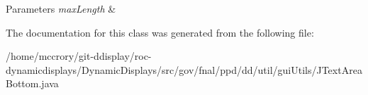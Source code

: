 \begin{DoxyParams}{Parameters}
{\em max\-Length} & \\
\hline
\end{DoxyParams}


The documentation for this class was generated from the following file\-:\begin{DoxyCompactItemize}
\item 
/home/mccrory/git-\/ddisplay/roc-\/dynamicdisplays/\-Dynamic\-Displays/src/gov/fnal/ppd/dd/util/gui\-Utils/J\-Text\-Area\-Bottom.\-java\end{DoxyCompactItemize}
